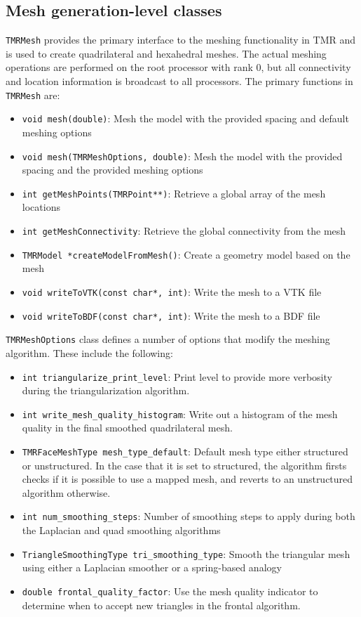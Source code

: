 \documentclass[12pt]{article}
\begin{document}
\subsection{Mesh generation-level classes}

\texttt{TMRMesh} provides the primary interface to the meshing functionality in TMR and is used to create quadrilateral and hexahedral meshes.
The actual meshing operations are performed on the root processor with rank 0, but all connectivity and location information is broadcast to all processors.
The primary functions in \texttt{TMRMesh} are:
\begin{itemize}
\item \texttt{void mesh(double)}: Mesh the model with the provided spacing and default meshing options
\item \texttt{void mesh(TMRMeshOptions, double)}: Mesh the model with the provided spacing and the provided meshing options
\item \texttt{int getMeshPoints(TMRPoint**)}: Retrieve a global array of the mesh locations
\item \texttt{int getMeshConnectivity}: Retrieve the global connectivity from the mesh
\item \texttt{TMRModel *createModelFromMesh()}: Create a geometry model based on the mesh
\item \texttt{void writeToVTK(const char*, int)}: Write the mesh to a VTK file
\item \texttt{void writeToBDF(const char*, int)}: Write the mesh to a BDF file
\end{itemize}

\texttt{TMRMeshOptions} class defines a number of options that modify the meshing algorithm. These include the following:
\begin{itemize}
\item \texttt{int triangularize\_print\_level}: Print level to provide more
  verbosity during the triangularization algorithm.
\item \texttt{int write\_mesh\_quality\_histogram}: Write out a histogram of the mesh quality in the final smoothed quadrilateral mesh.
\item \texttt{TMRFaceMeshType mesh\_type\_default}: Default mesh type either structured or unstructured. In the case that it is set to structured, the algorithm firsts checks if it is possible to use a mapped mesh, and reverts to an unstructured algorithm otherwise.
\item \texttt{int num\_smoothing\_steps}: Number of smoothing steps to apply during both the Laplacian and quad smoothing algorithms
\item \texttt{TriangleSmoothingType tri\_smoothing\_type}: Smooth the triangular mesh using either a Laplacian smoother or a spring-based analogy
\item \texttt{double frontal\_quality\_factor}: Use the mesh quality indicator to determine when to accept new triangles in the frontal algorithm.
\end{itemize}
\end{document}
